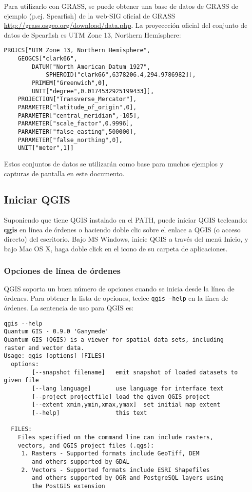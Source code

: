 Para utilizarlo con GRASS, se puede obtener una base de datos de GRASS de ejemplo (p.ej. Spearfish) 
de la web-SIG oficial de GRASS \url{http://grass.osgeo.org/download/data.php}. 
La proyeccción oficial del conjunto de datos de Spearfish es UTM Zone 13, Northern Hemisphere: 

\begin{verbatim}
PROJCS["UTM Zone 13, Northern Hemisphere",
    GEOGCS["clark66",
        DATUM["North_American_Datum_1927",
            SPHEROID["clark66",6378206.4,294.9786982]],
        PRIMEM["Greenwich",0],
        UNIT["degree",0.0174532925199433]],
    PROJECTION["Transverse_Mercator"],
    PARAMETER["latitude_of_origin",0],
    PARAMETER["central_meridian",-105],
    PARAMETER["scale_factor",0.9996],
    PARAMETER["false_easting",500000],
    PARAMETER["false_northing",0],
    UNIT["meter",1]]
\end{verbatim}

Estos conjuntos de datos se utilizarán como base para muchos ejemplos y 
capturas de pantalla en este documento.

\subsection{Iniciar QGIS}\label{label_startinqgis}

Suponiendo que tiene QGIS instalado en el PATH, puede iniciar QGIS tecleando:
\textbf{qgis} en línea de órdenes o haciendo doble clic sobre el enlace a QGIS 
(o acceso directo) del escritorio. Bajo MS Windows, inicie QGIS a través 
del menú Inicio, y bajo Mac OS X, haga doble click en el icono de su carpeta de aplicaciones.

\subsubsection{Opciones de línea de órdenes}
\label{label_commandline}

QGIS soporta un buen número de opciones cuando se inicia desde la línea de 
órdenes. Para obtener la lista de opciones, teclee \texttt{qgis ---help} en la
línea de órdenes.
La sentencia de uso para QGIS es:

\small
\begin{verbatim}
qgis --help
Quantum GIS - 0.9.0 'Ganymede'
Quantum GIS (QGIS) is a viewer for spatial data sets, including
raster and vector data.
Usage: qgis [options] [FILES]
  options:
        [--snapshot filename]   emit snapshot of loaded datasets to given file
        [--lang language]       use language for interface text
        [--project projectfile] load the given QGIS project
        [--extent xmin,ymin,xmax,ymax]  set initial map extent
        [--help]                this text

  FILES:
    Files specified on the command line can include rasters,
    vectors, and QGIS project files (.qgs):
     1. Rasters - Supported formats include GeoTiff, DEM
        and others supported by GDAL
     2. Vectors - Supported formats include ESRI Shapefiles
        and others supported by OGR and PostgreSQL layers using
        the PostGIS extension
\end{verbatim}
\normalsize

